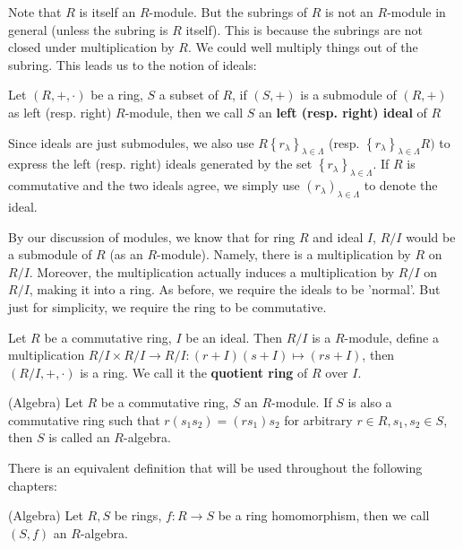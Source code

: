 \documentclass{note-eng}
\begin{document}
Note that $R$ is itself an $R$-module. But the subrings of $R$ is not an $R$-module in general (unless the subring is $R$ itself). This is because the subrings are not closed under multiplication by $R$. We could well multiply things out of the subring. This leads us to the notion of ideals:

\begin{definition}
    Let $(R, +, \cdot)$ be a ring, $S$ a subset of $R$, if $(S, +)$ is a submodule of $(R, +)$ as left (resp. right) $R$-module, then we call $S$ an \textbf{left (resp. right) ideal} of $R$
\end{definition}

Since ideals are just submodules, we also use $R\left\lbrace r_\lambda \right\rbrace_{\lambda \in \Lambda}$ (resp. $\left\lbrace r_\lambda \right\rbrace_{\lambda \in \Lambda} R)$ to express the left (resp. right) ideals generated by the set $\left\lbrace r_{\lambda} \right\rbrace_{\lambda \in \Lambda}$. If $R$ is commutative and the two ideals agree, we simply use $(r_\lambda)_{\lambda \in \Lambda}$ to denote the ideal.

By our discussion of modules, we know that for ring $R$ and ideal $I$, $R / I$ would be a submodule of $R$ (as an $R$-module). Namely, there is a multiplication by $R$ on $R / I$. Moreover, the multiplication actually induces a multiplication by $R / I$ on $R / I$, making it into a ring. As before, we require the ideals to be 'normal'. But just for simplicity, we require the ring to be commutative.

\begin{definition}
    Let $R$ be a commutative ring, $I$ be an ideal. Then $R / I$ is a $R$-module, define a multiplication $R / I \times R / I \rightarrow R / I: (r + I)(s + I) \mapsto (rs + I)$, then $(R / I, +, \cdot)$ is a ring. We call it the \textbf{quotient ring} of $R$ over $I$.
\end{definition}

\iffalse

\begin{definition}
    (Algebra) Let $R$ be a commutative ring, $S$ an $R$-module. If $S$ is also a commutative ring such that $r(s_1s_2) = (rs_1)s_2$ for arbitrary $r \in R, s_1, s_2 \in S$, then $S$ is called an $R$-algebra.
\end{definition}

There is an equivalent definition that will be used throughout the following chapters:

\begin{definition}
(Algebra) Let $R, S$ be rings, $f: R \rightarrow S$ be a ring homomorphism, then we call $(S, f)$ an $R$-algebra.
\end{definition}
\end{document}
